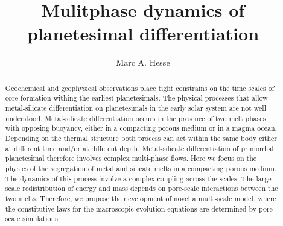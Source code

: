 \documentclass[12pt]{article}
\title{Mulitphase dynamics of planetesimal differentiation}
\author{Marc A. Hesse}
\begin{document}
\maketitle
\begin{abstract}
Geochemical and geophysical observations place tight constrains on the time scales of core formation withing the earliest planetesimals.
The physical processes that allow metal-silicate differentiation on planetesimals in the early solar system are not well understood. Metal-silicate differentiation occurs in the presence of two melt phases with opposing buoyancy, either in a compacting porous medium or in a magma ocean. Depending on the thermal structure both process can act within the same body either at different time and/or at different depth. Metal-silicate differentiation of primordial planetesimal therefore involves complex multi-phase flows.
Here we focus on the physics of the segregation of metal and silicate melts in a compacting porous medium. The dynamics of this process involve a complex coupling across the scales. The large-scale redistribution of energy and mass depends on pore-scale interactions between the two melts. Therefore, we propose the development of novel a multi-scale model, where the constitutive laws for the macroscopic evolution equations are determined by pore-scale simulations.
\end{abstract}
\end{document}
